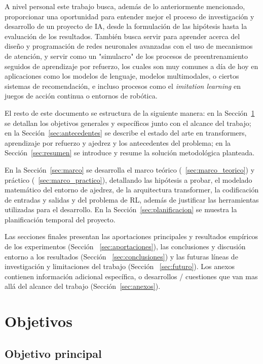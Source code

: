 \documentclass[12pt, a4paper]{article}
\begin{document}
A nivel personal este trabajo busca, además de lo anteriormente mencionado, proporcionar una oportunidad para entender mejor el proceso de investigación y desarrollo de un proyecto de IA, desde la formulación de las hipótesis hasta la evaluación de los resultados. También busca servir para aprender acerca del diseño y programación de redes neuronales avanzadas con el uso de mecanismos de atención, y servir como un "simulacro" de los procesos de preentrenamiento seguidos de aprendizaje por refuerzo, los cuales son muy comunes a día de hoy en aplicaciones como los modelos de lenguaje, modelos multimodales, o ciertos sistemas de recomendación, e incluso procesos como el \textit{imitation learning} en juegos de acción continua o entornos de robótica.

El resto de este documento se estructura de la siguiente manera: en la Sección~\ref{sec:objetivos} se detallan los objetivos generales y específicos junto con el alcance del trabajo; en la Sección~\ref{sec:antecedentes} se describe el estado del arte en transformers, aprendizaje por refuerzo y ajedrez y los antecedentes del problema; en la Sección~\ref{sec:resumen} se introduce y resume la solución metodológica planteada. 

En la Sección~\ref{sec:marco} se desarrolla el marco teórico (~\ref{sec:marco_teorico}) y práctico (~\ref{sec:marco_practico}), detallando las hipótesis a probar, el modelado matemático del entorno de ajedrez, de la arquitectura transformer, la codificación de entradas y salidas y del problema de RL, además de justificar las herramientas utilizadas para el desarrollo. En la Sección~\ref{sec:planificacion} se muestra la planificación temporal del proyecto. 

Las secciones finales presentan las aportaciones principales y resultados empíricos de los experimentos (Sección ~\ref{sec:aportaciones}), las conclusiones y discusión entorno a los resultados (Sección ~\ref{sec:conclusiones}) y las futuras líneas de investigación y limitaciones del trabajo (Sección ~\ref{sec:futuro}). Los anexos contienen información adicional específica, o desarrollos / cuestiones que van mas allá del alcance del trabajo (Sección~\ref{sec:anexos}).

\newpage

\section{Objetivos}\label{sec:objetivos}

\subsection{Objetivo principal}
\end{document}
